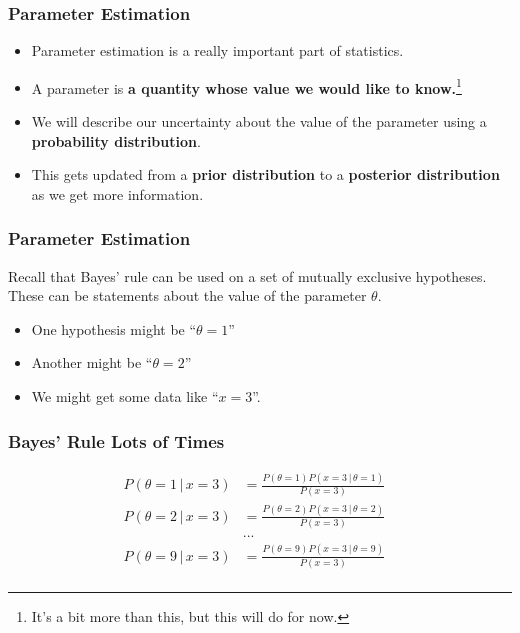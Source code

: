 \documentclass{beamer}
\newcommand{\given}{\,|\,}
\begin{document}
\begin{frame}
\frametitle{Parameter Estimation}

\begin{itemize}
\item Parameter estimation is a really important part of statistics.\pause
\item A parameter is {\bf a quantity whose value we would like to
        know.}\footnote{It's a bit more than this, but this will do for now.}\pause
\item We will describe our uncertainty about the value of the parameter
using a {\bf probability distribution}.\pause
\item This gets updated from a {\bf prior distribution}
    to a {\bf posterior distribution}
    as we get more information.
\end{itemize}

\end{frame}

\begin{frame}
\frametitle{Parameter Estimation}
Recall that Bayes' rule can be used on a set of mutually exclusive hypotheses.
These can be statements about the value of the parameter $\theta$.\pause

\begin{itemize}
\item One hypothesis might be ``$\theta = 1$'' \pause
\item Another might be ``$\theta = 2$'' \pause
\item We might get some data like ``$x = 3$''.
\end{itemize}

\end{frame}


\begin{frame}
\frametitle{Bayes' Rule Lots of Times}
\begin{align}
P(\theta = 1 \given x = 3) &= \frac{P(\theta=1)P(x=3 \given \theta=1)}{P(x=3)}\\
P(\theta = 2 \given x = 3) &= \frac{P(\theta=2)P(x=3 \given \theta=2)}{P(x=3)}\\
&...&\\
P(\theta = 9 \given x = 3) &= \frac{P(\theta=9)P(x=3 \given \theta=9)}{P(x=3)}\\
\end{align}

\end{frame}
\end{document}
